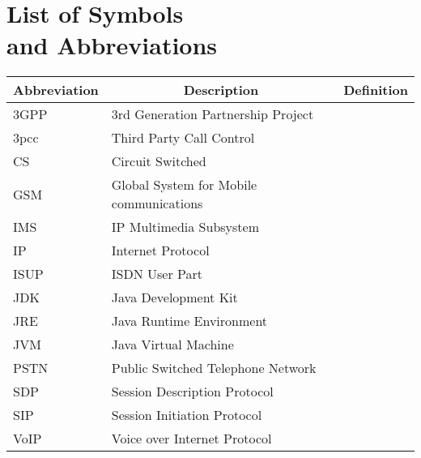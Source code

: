 

\chapter[List of Symbols and Abbreviations]{List of Symbols\\ and Abbreviations}

\begin{center}
\small
\begin{longtable}{lp{3.0in}c}
\toprule
\multicolumn{1}{c}{Abbreviation}
                & \multicolumn{1}{c}{Description}
                                & \multicolumn{1}{c}{Definition}\\ \midrule\addlinespace[2pt] \endhead
\bottomrule\endfoot
3GPP			& 3rd Generation Partnership Project 		& \pref{sym:3GPP}\\
3pcc			& Third Party Call Control						& \pref{sym:3pcc}\\
CS				& Circuit Switched								& \pref{sym:CS}\\
GSM			& Global System for Mobile communications & \pref{sym:GSM}\\
IMS			& IP Multimedia Subsystem						& \pref{sym:IMS}\\
IP				& Internet Protocol								& \pref{sym:IP}\\
ISUP			& ISDN User Part									& \pref{sym:ISUP}\\
JDK			& Java Development Kit        				& \pref{sym:JDK}\\
JRE			& Java Runtime Environment        			& \pref{sym:JRE}\\
JVM			& Java Virtual Machine        				& \pref{sym:JVM}\\
PSTN			& Public Switched Telephone Network			& \pref{sym:PSTN}\\
SDP			& Session Description Protocol				& \pref{sym:SDP}\\
SIP			& Session Initiation Protocol					& \pref{sym:SIP}\\
VoIP			& Voice over Internet Protocol				& \pref{sym:VoIP}\\




\end{longtable}
\end{center}

